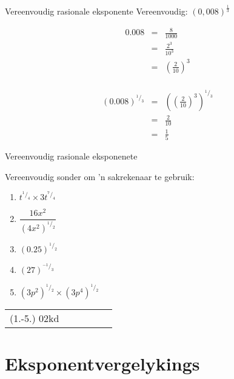 \begin{wex}{Vereenvoudig rasionale eksponente} 
{Vereenvoudig: $(0,008)^{\frac{1}{3}}$}
{%

\begin{eqnarray*}
 0.008 & = & \frac{8}{1000} \\
       & = & \frac{2^3}{10^3} \\
       & = & \left(\frac{2}{10}\right)^3\\
\end{eqnarray*}

\begin{eqnarray*}
 (0.008)^{^1/_3} & = & \left(\left(\frac{2}{10}\right)^3\right)^{^1/_3} \\
		 & = & \frac{2}{10} \\
		 & = & \frac{1}{5}
\end{eqnarray*}
}
\end{wex}

\begin{exercises}{Vereenvoudig rasionale eksponenete}
{
Vereenvoudig sonder om ’n sakrekenaar te gebruik:
\begin{multicols}{2}
\begin{enumerate}[noitemsep, label=\textbf{\arabic*}., itemsep=5pt]
 \item $ t^{^1/_4} \times 3t^{^7/_4} $
 \item $ \dfrac{16x^2}{(4x^2)^{^1/_2}} $
 \item $ (0.25)^{^1/_2} $
 \item $ (27)^{^{-1}/_3} $
 \item $ (3p^2)^{^1/_2} \times (3p^4)^{^1/_2} $
\end{enumerate}
\end{multicols}

\par \practiceinfo
\par \begin{tabular}[h]{cccccc}
(1.-5.)	02kd	&
\end{tabular}
}
\end{exercises}







\section{Eksponentvergelykings}

